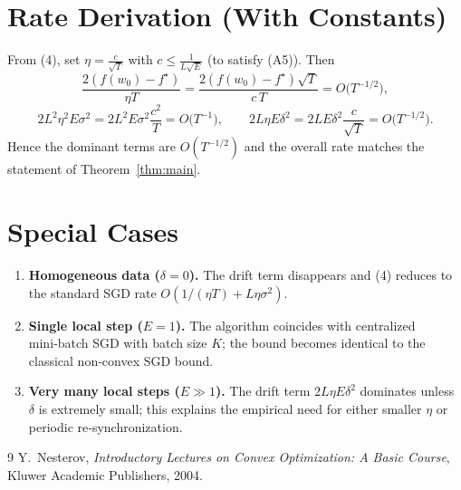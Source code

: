 \documentclass{article}
\begin{document}
\section*{Rate Derivation (With Constants)}
From (4), set $\eta = \frac{c}{\sqrt{T}}$ with $c\le \frac{1}{L\sqrt{E}}$ (to satisfy (A5)). Then
\[
\frac{2(f(w_0)-f^\star)}{\eta T}
= \frac{2(f(w_0)-f^\star)\sqrt{T}}{c\,T}
= O\!\bigl(T^{-1/2}\bigr),
\]
\[
2L^{2}\eta^{2}E\sigma^{2}
= 2L^{2}E\sigma^{2}\frac{c^{2}}{T}
= O\!\bigl(T^{-1}\bigr),
\qquad
2L\eta E\delta^{2}
= 2L E\delta^{2}\frac{c}{\sqrt{T}}
= O\!\bigl(T^{-1/2}\bigr).
\]
Hence the dominant terms are $O(T^{-1/2})$ and the overall rate matches the statement of Theorem~\ref{thm:main}.

\section*{Special Cases}
\begin{enumerate}
\item \textbf{Homogeneous data ($\delta=0$).} The drift term disappears and (4) reduces to the standard SGD rate $O(1/(\eta T) + L\eta\sigma^{2})$.
\item \textbf{Single local step ($E=1$).} The algorithm coincides with centralized mini‑batch SGD with batch size $K$; the bound becomes identical to the classical non‑convex SGD bound.
\item \textbf{Very many local steps ($E\gg1$).} The drift term $2L\eta E\delta^{2}$ dominates unless $\delta$ is extremely small; this explains the empirical need for either smaller $\eta$ or periodic re‑synchronization.
\end{enumerate}

\begin{thebibliography}{9}
Y.~Nesterov, \emph{Introductory Lectures on Convex Optimization: A Basic Course}, Kluwer Academic Publishers, 2004.
\end{thebibliography}
\end{document}

